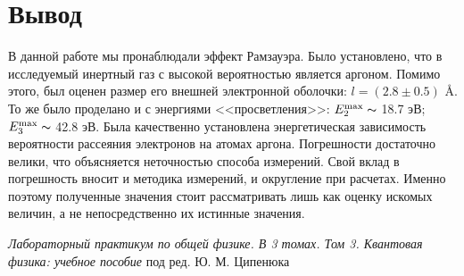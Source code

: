 \documentclass[12pt,a4paper]{article}
\begin{document}
\clearpage
    
\section*{Вывод}

В данной работе мы пронаблюдали эффект Рамзауэра. Было установлено, что в исследуемый инертный газ с высокой вероятностью является аргоном. Помимо этого, был оценен размер его внешней электронной оболочки: $l = (2.8 \pm 0.5)$ \AA. То же было проделано и с энергиями <<просветления>>: $E_2^\text{max} \thicksim $ 18.7 эВ; $E_3^\text{max} \thicksim $ 42.8 эВ. Была качественно установлена энергетическая зависимость вероятности рассеяния электронов на атомах аргона. Погрешности достаточно велики, что объясняется неточностью способа измерений. Свой вклад в погрешность вносит и методика измерений, и округление при расчетах. Именно поэтому полученные значения стоит рассматривать лишь как оценку искомых величин, а не непосредственно их истинные значения.

\vfill
    
\begin{thebibliography}{9}
	 \emph{Лабораторный практикум по общей физике. В 3 томах. Том 3. Квантовая физика: учебное пособие} под ред. Ю. М. Ципенюка
\end{thebibliography}
\end{document}
